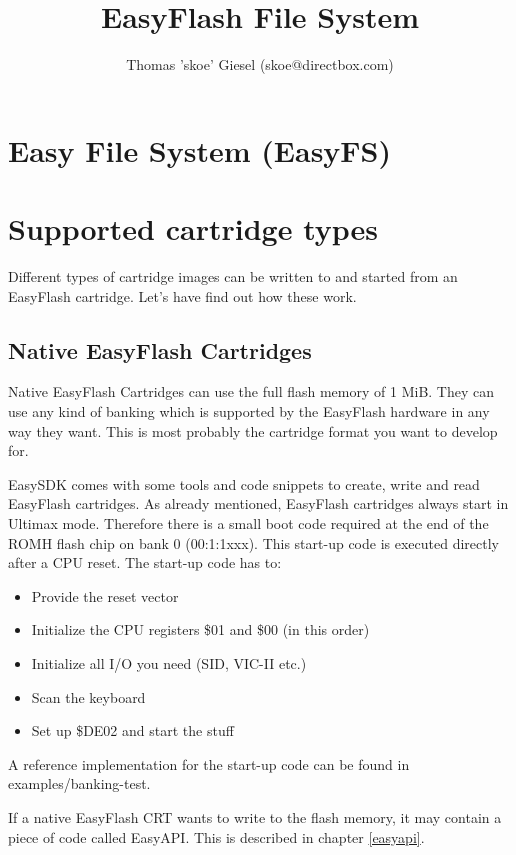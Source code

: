 \documentclass[a4paper,oneside]{memoir}
\title{EasyFlash File System}
\author{
Thomas 'skoe' Giesel
(skoe@directbox.com)
}
\begin{document}
\hsize
\maketitle

\tableofcontents

\chapter{Easy File System (EasyFS)}

\chapter{Supported cartridge types}

Different types of cartridge images can be written to and started from an
EasyFlash cartridge. Let's have find out how these work.

\section{Native EasyFlash Cartridges}\label{native-easyflash-cartridges}

Native EasyFlash Cartridges can use the full flash memory of 1 MiB. They can
use any kind of banking which is supported by the EasyFlash hardware in any way
they want. This is most probably the cartridge format you want to develop for.

EasySDK comes with some tools and code snippets to create, write and read
EasyFlash cartridges.
As already mentioned, EasyFlash cartridges always start in Ultimax mode.
Therefore there is a small boot code required at the end of the ROMH flash chip
on bank 0 (00:1:1xxx). This start-up code is executed directly after a CPU
reset.
The start-up code has to:

\begin{itemize}
  \item Provide the reset vector
  \item Initialize the CPU registers \$01 and \$00 (in this order)
  \item Initialize all I/O you need (SID, VIC-II etc.)
  \item Scan the keyboard
  \item Set up \$DE02 and start the stuff
\end{itemize}

A reference implementation for the start-up code can be found in
examples/banking-test.

If a native EasyFlash CRT wants to write to the flash memory, it may contain a
piece of code called EasyAPI. This is described in chapter \ref{easyapi}.
\end{document}
